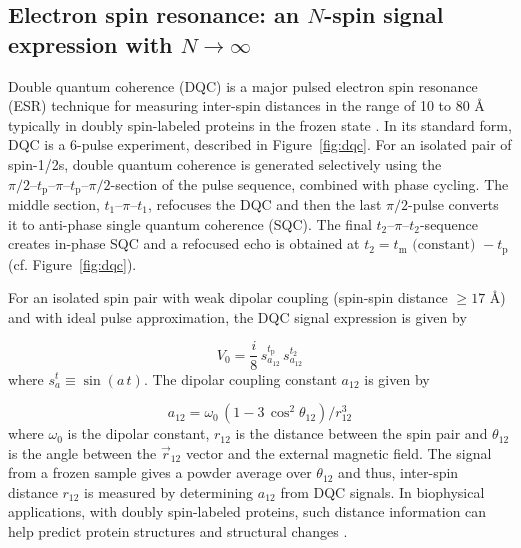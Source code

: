 \subsection{Electron spin resonance: an $N$-spin signal expression with $N\to\infty$} %
\label{sec:esr}
Double quantum coherence (DQC) is a major pulsed electron spin resonance (ESR) technique for measuring inter-spin distances in the range of 10 to 80 \AA\, typically in doubly spin-labeled proteins in the frozen state \cite{Saxena1997aug,Borbat1999nov,SinhaRoy2026jan}. In its standard form, DQC is a 6-pulse experiment, described in Figure~\ref{fig:dqc}. For an isolated pair of spin-1/2s, double quantum coherence is generated selectively using the $\pi/2 \text{--} t_\mathrm{p} \text{--} \pi \text{--} t_\mathrm{p} \text{--} \pi/2$-section of the pulse sequence, combined with phase cycling. The middle section, $t_1 \text{--} \pi \text{--} t_1$, refocuses the DQC and then the last $\pi/2$-pulse converts it to anti-phase single quantum coherence (SQC). The final $t_2 \text{--} \pi \text{--} t_2$-sequence creates in-phase SQC and a refocused echo is obtained at $t_2 = t_\mathrm{m} \text{ (constant) } - t_\mathrm{p}$ (cf. Figure~\ref{fig:dqc}). 

For an isolated spin pair with weak dipolar coupling (spin-spin distance $\ge 17$ \AA) and with ideal pulse approximation, the DQC signal expression is given by \cite{Borbat1999nov}

\begin{equation}
    V_{0} = \frac{i}{8} \, s_{a_{12}}^{t_\mathrm{p}}\,s_{a_{12}}^{t_2}
    \label{eqn:eq-dqcideal}
\end{equation}
where $s_a^t \equiv \sin{(a\, t)}$. The dipolar coupling constant $a_{12}$ is given by \cite{Borbat1999nov}

\begin{equation}
    a_{12} = \omega_0\,(1-3\,\cos^2{\theta_{12}})/r_{12}^3  
    \label{eqn:eq-dipCoup}
\end{equation}
where $\omega_0$ is the dipolar constant, $r_{12}$ is the distance between the spin pair and $\theta_{12}$ is the angle between the $\overrightarrow{r}_{12}$ vector and the external magnetic field. The signal from a frozen sample gives a powder average over $\theta_{12}$ and thus, inter-spin distance $r_{12}$ is measured by determining $a_{12}$ from DQC signals. In biophysical applications, with doubly spin-labeled proteins, such distance information can help predict protein structures and structural changes \cite{Borbat1999nov,SinhaRoy2026jan}.  

